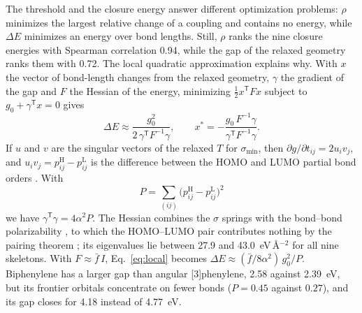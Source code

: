 \documentclass[11pt]{article}
\newcommand{\T}{\mathsf{T}}
\begin{document}
The threshold and the closure energy answer different optimization problems: $\rho$ minimizes the largest relative change of a coupling and contains no energy, while $\Delta E$ minimizes an energy over bond lengths. Still, $\rho$ ranks the nine closure energies with Spearman correlation 0.94, while the gap of the relaxed geometry ranks them with 0.72. The local quadratic approximation explains why. With $x$ the vector of bond-length changes from the relaxed geometry, $\gamma$ the gradient of the gap and $F$ the Hessian of the energy, minimizing $\tfrac12x^\T Fx$ subject to $g_0+\gamma^\T x=0$ gives
\begin{equation}
\Delta E\approx\frac{g_0^2}{2\,\gamma^\T F^{-1}\gamma},\qquad x^*=-\frac{g_0\,F^{-1}\gamma}{\gamma^\T F^{-1}\gamma}.
\label{eq:local}
\end{equation}
If $u$ and $v$ are the singular vectors of the relaxed $T$ for $\sigma_{\min}$, then $\partial g/\partial t_{ij}=2u_iv_j$, and $u_iv_j=p^{\mathrm{H}}_{ij}-p^{\mathrm{L}}_{ij}$ is the difference between the HOMO and LUMO partial bond orders \citep{CoulsonLH1947}. With
\begin{equation}
P=\sum_{(ij)}\bigl(p^{\mathrm{H}}_{ij}-p^{\mathrm{L}}_{ij}\bigr)^2
\label{eq:P}
\end{equation}
we have $\gamma^\T\gamma=4\alpha^2P$. The Hessian combines the $\sigma$ springs with the bond--bond polarizability \citep{CoulsonLH1947,BHM1966}, to which the HOMO--LUMO pair contributes nothing by the pairing theorem \citep{CoulsonRushbrooke1940,FowlerRassat2002}; its eigenvalues lie between 27.9 and 43.0~eV\,\AA$^{-2}$ for all nine skeletons. With $F\approx\bar f\,I$, Eq.~\eqref{eq:local} becomes $\Delta E\approx(\bar f/8\alpha^2)\,g_0^2/P$. Biphenylene has a larger gap than angular [3]phenylene, 2.58 against 2.39~eV, but its frontier orbitals concentrate on fewer bonds ($P=0.45$ against $0.27$), and its gap closes for 4.18 instead of 4.77~eV.
\end{document}

